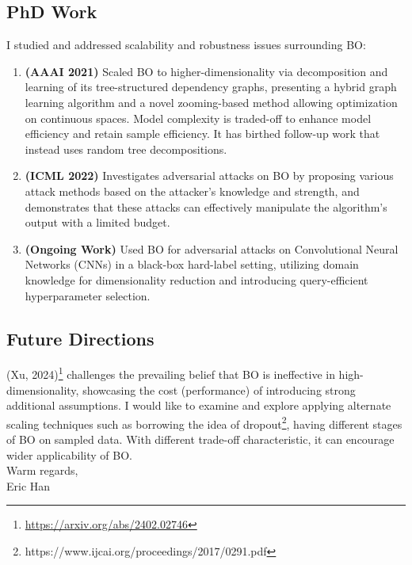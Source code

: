 \documentclass[11pt, a4paper]{article}
\begin{document}
\subsection{PhD Work}
I studied and addressed scalability and robustness issues surrounding BO:
\begin{enumerate}
  \item \textbf{(AAAI 2021)} Scaled BO to higher-dimensionality via decomposition and learning of its tree-structured dependency graphs, presenting a hybrid graph learning algorithm and a novel zooming-based method allowing optimization on continuous spaces. Model complexity is traded-off to enhance model efficiency and retain sample efficiency. It has birthed follow-up work that instead uses random tree decompositions.
  \item \textbf{(ICML 2022)} Investigates adversarial attacks on BO by proposing various attack methods based on the attacker's knowledge and strength, and demonstrates that these attacks can effectively manipulate the algorithm's output with a limited budget.
  \item \textbf{(Ongoing Work)} Used BO for adversarial attacks on Convolutional Neural Networks (CNNs) in a black-box hard-label setting, utilizing domain knowledge for dimensionality reduction and introducing query-efficient hyperparameter selection.
\end{enumerate}

\subsection{Future Directions}

(Xu, 2024)\footnote{\url{https://arxiv.org/abs/2402.02746}} challenges the prevailing belief that BO is ineffective in high-dimensionality, showcasing the cost (performance) of introducing strong additional assumptions. I would like to examine and explore applying alternate scaling techniques such as borrowing the idea of dropout\footnote{https://www.ijcai.org/proceedings/2017/0291.pdf}, having different stages of BO on sampled data. With different trade-off characteristic, it can encourage wider applicability of BO. \\[1em]

Warm regards,\\
Eric Han\\

\printbibliography
\end{document}
